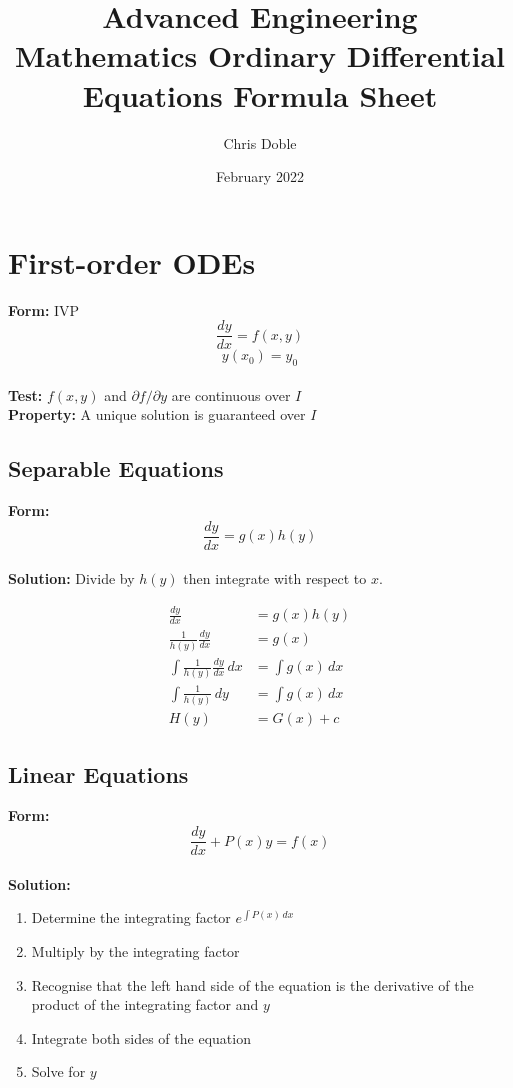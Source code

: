 \documentclass{article}
\title{Advanced Engineering Mathematics Ordinary Differential Equations Formula Sheet}
\author{Chris Doble}
\date{February 2022}
\begin{document}
\tableofcontents

\section{First-order ODEs}

\textbf{Form:} IVP \[\frac{d y}{d x} = f(x, y)\] \[y(x_0) = y_0\] \\ \textbf{Test:} $f(x, y)$ and $\partial f / \partial y$ are continuous over $I$ \\ \textbf{Property:} A unique solution is guaranteed over $I$

\subsection{Separable Equations}

\textbf{Form:} \[\frac{d y}{d x} = g(x) h(y)\] \\ \textbf{Solution:} Divide by $h(y)$ then integrate with respect to $x$.

\begin{align*}
  \frac{d y}{d x}                          & = g(x) h(y)      \\
  \frac{1}{h(y)} \frac{d y}{d x}           & = g(x)           \\
  \int \frac{1}{h(y)} \frac{d y}{d x} \,dx & = \int g(x) \,dx \\
  \int \frac{1}{h(y)} \,dy                 & = \int g(x) \,dx \\
  H(y)                                     & = G(x) + c
\end{align*}

\subsection{Linear Equations}

\textbf{Form:} \[\frac{d y}{d x} + P(x) y = f(x)\] \\ \textbf{Solution:}

\begin{enumerate}
  \item Determine the integrating factor $e^{\int P(x) \,d x}$

  \item Multiply by the integrating factor

  \item Recognise that the left hand side of the equation is the derivative of the product of the integrating factor and $y$

  \item Integrate both sides of the equation

  \item Solve for $y$
\end{enumerate}
\end{document}
